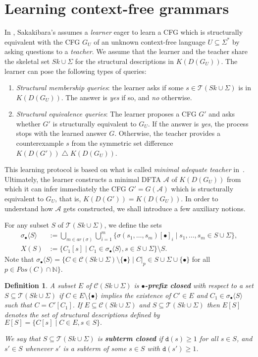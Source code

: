 \documentclass[preprint,12pt,english]{article}
\def\hole{\bullet}
\def\cA{\mathcal{A}}
\def\cC{\mathcal{C}}
\def\cT{\mathcal{T}}
\def\depth{\mathtt{d}}
\newcommand\pair[1]{\langle{#1}\rangle}
\newtheorem{definition}{Definition}
\begin{document}
\section{Learning context-free grammars}

In \cite{Sak:1990}, Sakakibara's  assumes  a {\em learner} eager to learn a CFG which is structurally equivalent with the CFG $G_U$ of an unknown context-free language $U\subseteq \Sigma^*$ by asking  questions to a {\em teacher}. We assume that the learner and the teacher share the skeletal set $Sk\cup\Sigma$ for the structural descriptions in $K(D(G_U))$. The learner can pose the following types of queries:
\begin{enumerate}
\item {\em Structural membership queries}: the learner asks if some $s\in\cT(Sk\cup\Sigma)$ is in $K(D(G_U))$. The answer is {\em yes} if so, and {\em no} otherwise.
\item {\em Structural equivalence queries}: The learner proposes a CFG $G'$ and asks whether $G'$ is structurally equivalent to $G_U$. 
If the answer is {\em yes}, the  process stops with the learned answer $G$. Otherwise, the teacher provides a counterexample $s$ from the symmetric set difference  $K(D(G')) \mathop{\triangle} K(D(G_U))$.
\end{enumerate}
This learning protocol is based on what is called {\em minimal adequate teacher} in~\cite{Angluin:87}.
Ultimately, the learner constructs a minimal DFTA $\cA$ of $K(D(G_U))$ from which it can infer immediately the CFG  $G'=G(\cA)$ which is structurally equivalent to $G_U$, that is, $K(D(G'))=K(D(G_U))$.  In order to understand how $\cA$ gets constructed, we shall introduce a few auxiliary notions. 

For any subset $S$ of $\cT(Sk\cup\Sigma)$, we define the sets 
\begin{align*}
\sigma_\hole\pair{S}&:=\bigcup_{m\in ar(\sigma)}\bigcup_{i=1}^m\{\sigma(s_1,\ldots,s_{m})[\hole]_i\mid s_1,\ldots,s_{m}\in S\cup\Sigma\},\\
X(S)&:=\{C_1[s]\mid C_1\in \sigma_\hole\pair{S},s\in S\cup\Sigma\}\setminus S.
\end{align*}
Note that $\sigma_\hole\pair{S}=\{C\in\cC(Sk\cup\Sigma)\setminus\{\hole\}\mid C|_p\in S\cup\Sigma\cup\{\hole\}$ for all $p\in Pos(C)\cap\mathbb{N}\}.$ 
\begin{definition}
A subset $E$ of $\cC(Sk\cup\Sigma)$ is {\bf $\bullet$-prefix closed} with respect to a set $S\subseteq \cT(Sk\cup\Sigma)$ if $C\in E\setminus\{\bullet\}$ implies the existence of $C'\in E$ and $C_1\in \sigma_\hole\pair{S}$ such that $C=C'[C_1].$ If $E\subseteq \cC(Sk\cup\Sigma)$ and $S\subseteq \cT(Sk\cup\Sigma)$ then $E[S]$ denotes the set of structural descriptions defined by
$E[S]=\{C[s]\mid C\in E,s\in S\}.$

We say that $S\subseteq\cT(Sk\cup\Sigma)$ is {\bf subterm closed} if $\depth(s)\geq 1$ for all $s\in S$, and $s'\in S$ whenever $s'$ is a subterm of some $s\in S$ with $\depth(s')\geq 1$.
\end{definition}
\end{document}
